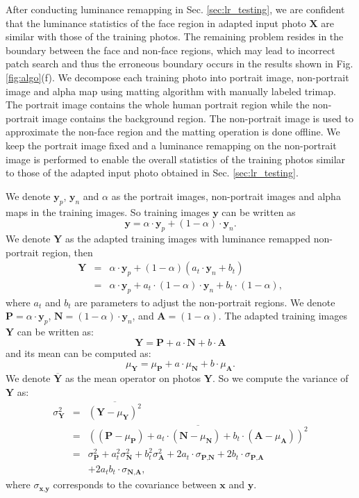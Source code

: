 \documentclass{article}
\def\avg{\overline}
\def\P{\textbf{P}}
\def\N{\textbf{N}}
\def\A{\textbf{A}}
\def\Y{\textbf{Y}}
\def\y{\textbf{y}}
\def\X{\textbf{X}}
\def\x{\textbf{x}}
\begin{document}
After conducting luminance remapping in Sec. \ref{sec:lr_testing}, we are confident that the luminance statistics of the face region in adapted input photo $\X$ are similar with those of the training photos. The remaining problem resides in the boundary between the face and non-face regions, which may lead to incorrect patch search and thus the erroneous boundary occurs in the results shown in Fig. \ref{fig:algo}(f). We decompose each training photo into portrait image, non-portrait image and alpha map using matting algorithm \cite{levin-pami08-matting} with manually labeled trimap. The portrait image contains the whole human portrait region while the non-portrait image contains the background region. The non-portrait image is used to approximate the non-face region and the matting operation is done offline. We keep the portrait image fixed and a luminance remapping on the non-portrait image is performed to enable the overall statistics of the training photos similar to those of the adapted input photo obtained in Sec. \ref{sec:lr_testing}.

We denote $\y_p$, $\y_n$ and $\alpha$ as the portrait images, non-portrait images and alpha maps in the training images. So training images $\y$ can be written as
\begin{equation}
    \y=\alpha\cdot \y_p+(1-\alpha)\cdot \y_n.
\end{equation}
We denote $\Y$ as the adapted training images with luminance remapped non-portrait region, then
\begin{eqnarray}\label{eq:Y}
    \Y&=&\alpha\cdot \y_p + (1-\alpha)(a_t\cdot \y_n + b_t)\nonumber\\
    &=&\alpha\cdot \y_p + a_t\cdot (1-\alpha)\cdot \y_n + b_t\cdot (1-\alpha),
\end{eqnarray}
where $a_t$ and $b_t$ are parameters to adjust the non-portrait regions.
We denote $\P = \alpha\cdot \y_p$, $\N=(1-\alpha)\cdot \y_n$, and $\A=(1-\alpha)$. The adapted training images $\Y$ can be written as:
\begin{equation}
    \Y=\P + a\cdot \N + b\cdot \A
\end{equation}
and its mean can be computed as:
\begin{equation}\label{eq:avg_Y}
    \mu_{\Y}=\mu_{\P} + a\cdot \mu_{\N} + b\cdot \mu_{\A}.
\end{equation}
We denote $\avg{\Y}$ as the mean operator on photos $\Y$. So we compute the variance of $\Y$ as:
\begin{eqnarray}\label{eq:sigma_Y}
    \sigma_{\Y}^2&=&\avg{(\Y-\mu_{\Y})^2}\nonumber\\
    &=&\avg{\left((\P - \mu_{\P}) + a_t\cdot (\N-\mu_{\N}) + b_t\cdot (\A-\mu_{\A})\right)^2 }\nonumber\\
    &=&\sigma_{\P}^2 + a_t^2\sigma_{\N}^2 + b_t^2\sigma_{\A}^2 + 2a_t\cdot \sigma_{\P,\N} + 2b_t\cdot \sigma_{\P,\A}\nonumber\\ &&+ 2a_t b_t\cdot \sigma_{\N,\A},
\end{eqnarray}
where $\sigma_{\x,\y}$ corresponds to the covariance between $\x$ and $\y$.
\end{document}
